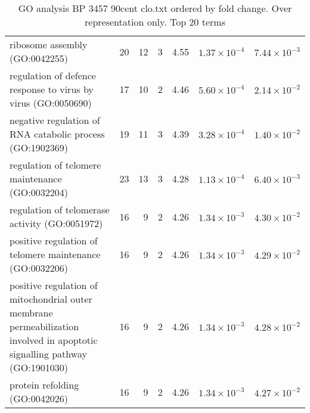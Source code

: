 \begin{table}[ht]
\begin{adjustbox}{width=\textwidth}
\begin{tabular}{lrrrlrr}
  ribosome assembly (GO:0042255) & 20 & 12 & 3 & 4.55 & $1.37 \times 10^{-4}$ & $7.44 \times 10^{-3}$ \\ 
  regulation of defence response to virus by virus (GO:0050690) & 17 & 10 & 2 & 4.46 & $5.60 \times 10^{-4}$ & $2.14 \times 10^{-2}$ \\ 
  negative regulation of RNA catabolic process (GO:1902369) & 19 & 11 & 3 & 4.39 & $3.28 \times 10^{-4}$ & $1.40 \times 10^{-2}$ \\ 
  regulation of telomere maintenance (GO:0032204) & 23 & 13 & 3 & 4.28 & $1.13 \times 10^{-4}$ & $6.40 \times 10^{-3}$ \\ 
  regulation of telomerase activity (GO:0051972) & 16 & 9 & 2 & 4.26 & $1.34 \times 10^{-3}$ & $4.30 \times 10^{-2}$ \\ 
  positive regulation of telomere maintenance (GO:0032206) & 16 & 9 & 2 & 4.26 & $1.34 \times 10^{-3}$ & $4.29 \times 10^{-2}$ \\ 
  positive regulation of mitochondrial outer membrane permeabilization involved in apoptotic signalling pathway (GO:1901030) & 16 & 9 & 2 & 4.26 & $1.34 \times 10^{-3}$ & $4.28 \times 10^{-2}$ \\ 
  protein refolding (GO:0042026) & 16 & 9 & 2 & 4.26 & $1.34 \times 10^{-3}$ & $4.27 \times 10^{-2}$ \\ 
   \hline
\end{tabular}
\end{adjustbox}
\caption{GO analysis BP 3457 90cent clo.txt ordered by fold change. Over representation only. Top 20 terms} 
\label{tab:GO analysis BP 3457 90cent clo.txt ordered by fold change. Over representation only. Top 20 terms}
\end{table}


